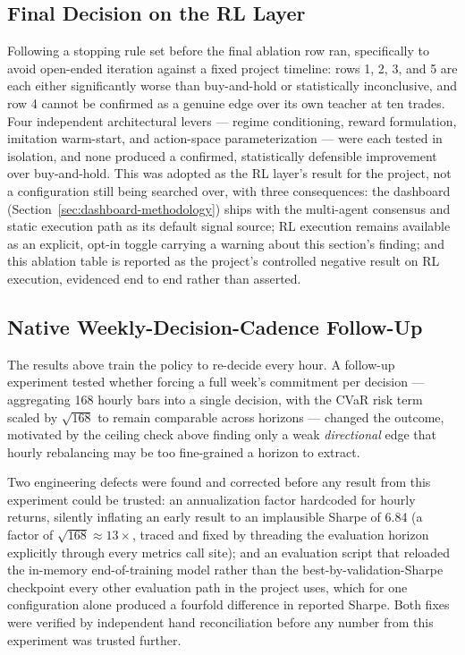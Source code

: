 \subsection{Final Decision on the RL Layer}
\label{subsec:rl-final-decision}

Following a stopping rule set before the final ablation row ran, specifically to avoid open-ended iteration against a fixed project timeline: rows 1, 2, 3, and 5 are each either significantly worse than buy-and-hold or statistically inconclusive, and row 4 cannot be confirmed as a genuine edge over its own teacher at ten trades. Four independent architectural levers --- regime conditioning, reward formulation, imitation warm-start, and action-space parameterization --- were each tested in isolation, and none produced a confirmed, statistically defensible improvement over buy-and-hold. This was adopted as the RL layer's result for the project, not a configuration still being searched over, with three consequences: the dashboard (Section~\ref{sec:dashboard-methodology}) ships with the multi-agent consensus and static execution path as its default signal source; RL execution remains available as an explicit, opt-in toggle carrying a warning about this section's finding; and this ablation table is reported as the project's controlled negative result on RL execution, evidenced end to end rather than asserted.

\subsection{Native Weekly-Decision-Cadence Follow-Up}
\label{subsec:rl-weekly-cadence}

The results above train the policy to re-decide every hour. A follow-up experiment tested whether forcing a full week's commitment per decision --- aggregating 168 hourly bars into a single decision, with the CVaR risk term scaled by $\sqrt{168}$ to remain comparable across horizons --- changed the outcome, motivated by the ceiling check above finding only a weak \emph{directional} edge that hourly rebalancing may be too fine-grained a horizon to extract.

Two engineering defects were found and corrected before any result from this experiment could be trusted: an annualization factor hardcoded for hourly returns, silently inflating an early result to an implausible Sharpe of 6.84 (a factor of $\sqrt{168}\approx13\times$, traced and fixed by threading the evaluation horizon explicitly through every metrics call site); and an evaluation script that reloaded the in-memory end-of-training model rather than the best-by-validation-Sharpe checkpoint every other evaluation path in the project uses, which for one configuration alone produced a fourfold difference in reported Sharpe. Both fixes were verified by independent hand reconciliation before any number from this experiment was trusted further.

